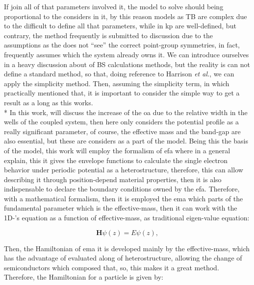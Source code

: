 If join all of that parameters involved it, the model to solve should being proportional to the considers in it, by this reason models as \gls{TB} are complex due to the difficult to define all that parameters, while in \gls{kp} are well-defined, but contrary, the method frequently is  submitted to discussion due to the assumptions as the does not ``see'' the correct point-group symmetries, in fact, frequently assumes which the system already owns it.  We can introduce ourselves in a heavy discussion about of \gls{BS} calculations methods, but the reality is can not define a standard method, so that, doing reference to Harrison \textit{et al.}\cite{harrison2016quantum}, we can apply the simplicity method.
Then, assuming the simplicity term, in which practically mentioned that, it is important to consider the simple way to get a result as a long as this works.\\*
In this work, will discuss the increase of the  \gls{oa}  due to the relative width in the wells of the coupled system, then here only considers the potential profile as a really significant parameter, of course, the effective mass and   the band-gap are also essential, but these are considers as a part of the model. Being this the basis of the model, this work will employ the formalism of \gls{efa} where in a general explain, this it  gives the envelope functions to calculate the single electron behavior under periodic potential as a heterostructure, therefore, this can allow describing it  through position-depend material properties\cite{foreman1996envelope,benduke1966spacecharge,bastard1990wave}, then it is also indispensable to declare the boundary conditions owned by the \gls{efa}. Therefore, with a mathematical formalism, then it is employed the \gls{ema} which parts of the fundamental  parameter which is the effective-mass, then it can work with the 1D-\sch's equation as a function of effective-mass, as traditional eigen-value equation:

\begin{equation}\label{eqn:chapter-2-sec-numerical-calculations-eigen-value-equation}
	\textbf{H}\psi(z)=E\psi(z),
\end{equation}

Then, the Hamiltonian of \gls{ema} it is developed mainly by the effective-mass, which has the advantage of evaluated along of heterostructure,  allowing  the change of semiconductors which composed that, so, this makes it a great method. Therefore, the Hamiltonian for a particle is given by\cite{kamizato1989excitons,bastard1990wave,foreman1996envelope}:

